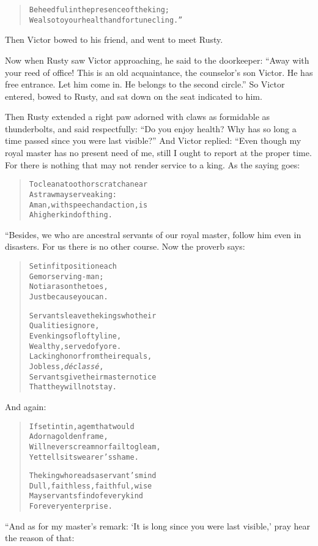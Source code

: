 \documentclass[article, twoside, 14pt]{memoir}
\renewenvironment{verbatim}{%
\begin{quote}%
\vskip -10pt%
\begin{alltt}\normalfont\large}{\end{alltt}%
\end{quote}%
\vskip -10pt
} %
\begin{document}
\begin{verbatim}
Be heedful in the presence of the king;
We also to your health and fortune cling.”
\end{verbatim}
Then Victor bowed to his friend, and went to meet Rusty.

Now when Rusty saw Victor approaching, he said to the doorkeeper:
``Away with your reed of office! This is an old acquaintance, the counselor's son Victor. He has free entrance. Let him come in. He belongs to the second circle.''
So Victor entered, bowed to Rusty, and sat down on the seat
indicated to him.

Then Rusty extended a right paw adorned with claws as formidable as
thunderbolts, and said respectfully:
``Do you enjoy health? Why has so long a time passed since you were last visible?''
And Victor replied: “Even though my royal master has no present
need of me, still I ought to report at the proper time. For there
is nothing that may not render service to a king. As the saying
goes:

\begin{verbatim}
To clean a tooth or scratch an ear
    A straw may serve a king:
A man, with speech and action, is
    A higher kind of thing.
\end{verbatim}
“Besides, we who are ancestral servants of our royal master, follow
him even in disasters. For us there is no other course. Now the
proverb says:

\begin{verbatim}
Set in fit position each
    Gem or serving-man;
No tiaras on the toes,
    Just because you can.

Servants leave the kings who their
    Qualities ignore,
Even kings of lofty line,
    Wealthy, served of yore.
Lacking honor from their equals,
    Jobless, \emph{déclassé},
Servants give their master notice
    That they will not stay.
\end{verbatim}
And again:

\begin{verbatim}
If set in tin, a gem that would
    Adorn a golden frame,
Will never scream nor fail to gleam,
    Yet tells its wearer's shame.

The king who reads a servant's mind{\textemdash}
    Dull, faithless, faithful, wise{\textemdash}
May servants find of every kind
    For every enterprise.
\end{verbatim}
“And as for my master's remark:
`It is long since you were last visible,' pray hear the reason of
that:
\end{document}
